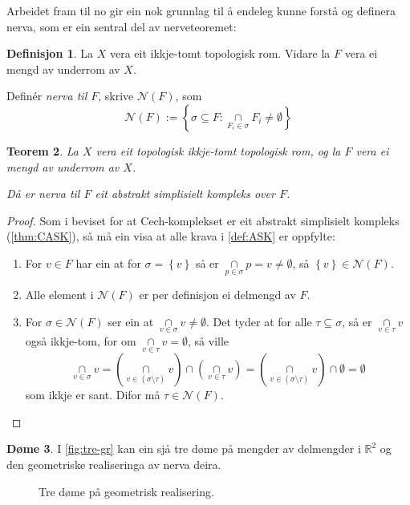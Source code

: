 \documentclass[a4paper, 12pt, norsk]{article}
\theoremstyle{plain}
\newtheorem{theorem}{Teorem}[section]
\theoremstyle{definition}
\newtheorem{definition}[theorem]{Definisjon}
\newtheorem{example}[theorem]{Døme}
\newcommand{\Rb}{\mathbb{R}}
\newcommand{\Nc}{\mathcal{N}}
\newcommand{\intersect}{ \mathop{\cap}\limits }
\newcommand{\set}[1]{ \left\{ #1 \right\} } %
\begin{document}
Arbeidet fram til no gir ein nok grunnlag til å endeleg kunne forstå og definera nerva, som er ein sentral del av nerveteoremet:

\begin{definition} \label{def:nerva}
	La $X$ vera eit ikkje-tomt topologisk rom. Vidare la $F$ vera ei mengd av underrom av $X$. 
	
	Definér \emph{nerva til $F$}, skrive $\Nc(F)$, som
	\begin{equation*}
		\Nc(F) := \left \{ \sigma \subseteq F : \intersect_{ F_i \in \sigma } F_i \neq \emptyset \right \}
	\end{equation*}
\end{definition}

\begin{theorem}
	La $X$ vera eit topologisk ikkje-tomt topologisk rom, og la $F$ vera ei mengd av underrom av $X$.
	
	Då er nerva til $F$ eit abstrakt simplisielt kompleks over $F$.
\end{theorem}

\begin{proof}
	Som i beviset for at Cech-komplekset er eit abstrakt simplisielt kompleks (\autoref{thm:CASK}), så må ein visa at alle krava i \autoref{def:ASK} er oppfylte:
	\begin{enumerate}
		\item{ 
			For \( v \in F \) har ein at for \( \sigma = \set{ v } \) så er \( \intersect_{ p \in \sigma } p = v \neq \emptyset \), så \( \set{v} \in \Nc(F) \).
		}
		\item{ 
			Alle element i \( \Nc(F) \) er per definisjon ei delmengd av \( F \).
		}
		\item{  
			For \( \sigma \in \Nc(F) \) ser ein at \( \intersect_{v\in\sigma} v \neq \emptyset \). Det tyder at for alle \( \tau \subseteq \sigma \), så er \( \intersect_{v\in\tau} v \) også ikkje-tom, for om \( \intersect_{v\in\tau} v = \emptyset \), så ville 
			\[ 
				\intersect_{v\in\sigma} v = \left( \intersect_{v\in(\sigma\setminus\tau)} v \right) \intersect \left( \intersect_{v\in\tau} v \right) = \left( \intersect_{v\in(\sigma\setminus\tau)} v \right) \intersect \emptyset = \emptyset 
			\] 
			som ikkje er sant. Difor må \( \tau \in \Nc(F) \).
		}
	\end{enumerate}
\end{proof}

\begin{example}
	I \autoref{fig:tre-gr} kan ein sjå tre døme på mengder av delmengder i \( \Rb^2 \) og den geometriske realiseringa av nerva deira.
	\begin{figure}[htbp]
		\begin{center}
			
		\end{center}
		\caption{Tre døme på geometrisk realisering.}
		\label{fig:tre-gr}
	\end{figure}
\end{example}
\end{document}
